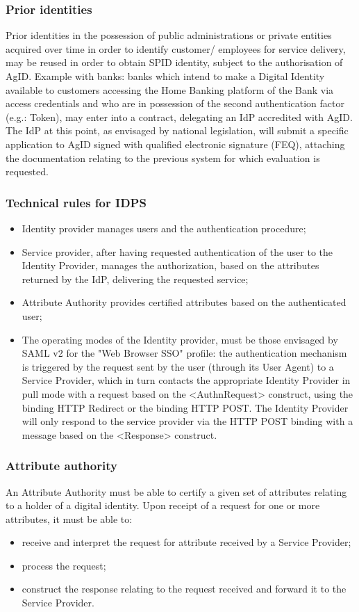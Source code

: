 \documentclass[a4paper, 10pt, titlepage]{article}
\begin{document}
\subsubsection{Prior identities}
Prior identities in the possession of public administrations or private entities acquired over time in order to identify customer/ employees for service delivery, may be reused in order to obtain SPID identity, subject to the authorisation of AgID. Example with banks: banks which intend to make a Digital Identity available to customers accessing the Home Banking platform of the Bank via access credentials and who are in possession of the second authentication factor (e.g.: Token), may enter into a contract, delegating an IdP
accredited with AgID. The IdP at this point, as envisaged by national legislation, will submit a specific application to AgID signed with qualified electronic signature (FEQ), attaching the documentation relating to the previous system for which evaluation is requested.

\subsubsection{Technical rules for IDPS}
\begin{itemize}
\item Identity provider manages users and the authentication procedure;
\item Service provider, after having requested authentication of the user to the Identity Provider, manages the authorization, based on the attributes returned by the IdP, delivering the requested service;
\item Attribute Authority provides certified attributes based on the authenticated user;
\item The operating modes of the Identity provider, must be those envisaged by SAML v2 for the "Web Browser SSO" profile: the authentication mechanism is triggered by the request sent by the user (through its User Agent) to a Service Provider, which in turn contacts the appropriate Identity Provider in pull mode with a request based on the <AuthnRequest> construct, using the binding HTTP Redirect or the binding HTTP POST. 
The Identity Provider will only respond to the service provider via the HTTP POST binding with a message based on the <Response> construct.
\end{itemize}

\subsubsection{Attribute authority}
An Attribute Authority must be able to certify a given set of attributes relating to a holder of a digital identity. Upon receipt of a request for one or more attributes, it must be able to:
\begin{itemize}
\item receive and interpret the request for attribute received by a Service Provider;
\item process the request;
\item construct the response relating to the request received and forward it to the Service Provider.
\end{itemize}
\end{document}
